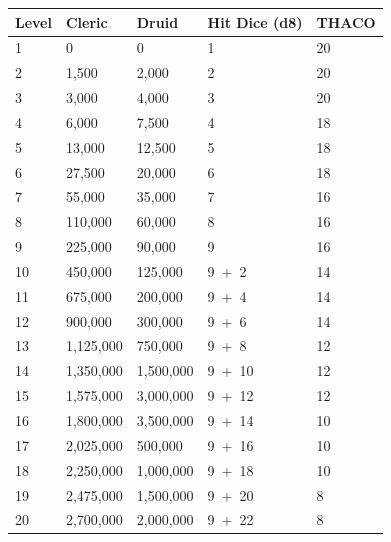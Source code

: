 \noindent
\begin{minipage}{\columnwidth}

\label{priestadvancement}
\noindent
\begin{tabular}{|m{}|m{}|m{}|m{}|m{}|}
\hline
Level	& Cleric	& Druid	& Hit Dice (d8)	& THACO \\
\hline\hline
\rowcolor[gray]{.9}1	& 0			& 0			& 1		& 20 \\
2	& 1,500		& 2,000		& 2		& 20 \\
\rowcolor[gray]{.9}3	& 3,000		& 4,000		& 3		& 20 \\
4	& 6,000		& 7,500		& 4		& 18 \\
\rowcolor[gray]{.9}5	& 13,000	& 12,500	& 5		& 18 \\
6	& 27,500	& 20,000	& 6		& 18 \\
\rowcolor[gray]{.9}7	& 55,000	& 35,000	& 7		& 16 \\
8	& 110,000	& 60,000	& 8		& 16 \\
\rowcolor[gray]{.9}9	& 225,000	& 90,000	& 9		& 16 \\
10	& 450,000	& 125,000	& 9~+~2	& 14 \\
\rowcolor[gray]{.9}11	& 675,000	& 200,000	& 9~+~4	& 14 \\
12	& 900,000	& 300,000	& 9~+~6	& 14 \\
\rowcolor[gray]{.9}13	& 1,125,000	& 750,000	& 9~+~8	& 12 \\
14	& 1,350,000	& 1,500,000	& 9~+~10	& 12 \\
\rowcolor[gray]{.9}15	& 1,575,000	& 3,000,000	& 9~+~12	& 12 \\
16	& 1,800,000	& 3,500,000	& 9~+~14	& 10 \\
\rowcolor[gray]{.9}17	& 2,025,000	& 500,000	& 9~+~16	& 10 \\
18	& 2,250,000	& 1,000,000	& 9~+~18	& 10 \\
\rowcolor[gray]{.9}19	& 2,475,000	& 1,500,000	& 9~+~20	& 8 \\
20	& 2,700,000	& 2,000,000	& 9~+~22	& 8 \\
\hline
\end{tabular}

\end{minipage}

